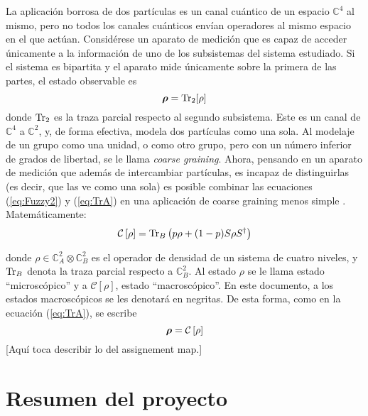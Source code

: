 \documentclass[onecolumn,11pt]{article}
\newcommand{\Cc}{\mathcal{C}} %
\newcommand{\Hh}{\mathbb{C}} %
\newcommand{\CG}[1]{\Cc\left[#1\right]}
\newcommand*{\B}[1]{\ifmmode\bm{#1}\else\textbf{#1}\fi}
\newcommand{\notaAd}[1]{{\color{blue} [#1]}} %
\begin{document}
La aplicación borrosa de dos partículas es un canal cuántico de un espacio $\Hh^{4}$ al mismo, pero no todos los canales cuánticos envían operadores al mismo espacio en el que actúan. Considérese un aparato de medición que es capaz de acceder únicamente a la información de uno de los subsistemas del sistema estudiado. Si el sistema es bipartita y el aparato mide únicamente sobre la primera de las partes, el estado observable es
\begin{equation}\label{eq:TrA}
\B{\rho}=\Tr_{2}[\rho]
\end{equation}
donde $\Tr_{2}$ es la traza parcial respecto al segundo subsistema. Este es un canal de $\Hh^{4}$ a $\Hh^{2}$, y, de forma efectiva, modela dos partículas como una sola. Al modelaje de un grupo como una unidad, o como otro grupo, pero con un número inferior de grados de libertad, se le llama \textit{coarse graining}. Ahora, pensando en un aparato de medición que además de intercambiar partículas, es incapaz de distinguirlas (es decir, que las ve como una sola) es posible combinar las ecuaciones (\ref{eq:Fuzzy2}) y (\ref{eq:TrA}) en una aplicación de coarse graining menos simple \cite{FuzzyMeasurements}. Matemáticamente:
\begin{equation}\label{eq:CG}
    \Cc\left[\rho\right]=\Tr_{B}\left(p\rho+(1-p)S\rho S^{\dag}\right)
\end{equation}

donde $\rho\in \Hh^{2}_{A}\otimes \Hh^{2}_{B}$ es el operador de densidad de un sistema de cuatro niveles, y $\Tr_{B}$ denota la traza parcial respecto a $\Hh^{2}_{B}$. Al estado $\rho$ se le llama estado ``microscópico'' y a $\CG{\rho}$, estado ``macroscópico''. En este documento, a los estados macroscópicos se les denotará en negritas. De esta forma, como en la ecuación (\ref{eq:TrA}), se escribe
\begin{equation}
    \B{\rho}=\CG{\rho}
\end{equation}
\notaAd{Aquí toca describir lo del assignement map.}
\vspace{0.5cm}
\section{Resumen del proyecto}
\end{document}
